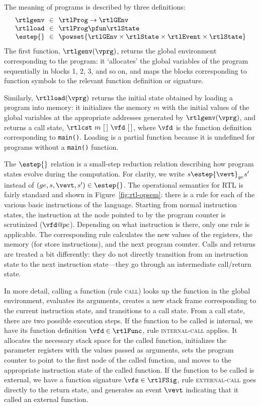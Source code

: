 The meaning of programs is described by three definitions:
\[
\begin{array}{r@{~~}c@{~~}l}
\rtlgenv &\in& \rtlProg \to \rtlGEnv \\
\rtlload &\in& \rtlProg \pfun \rtlState\\
\estep{} &\in& \powset{\rtlGEnv\times\rtlState\times\rtlEvent\times\rtlState}\\
\end{array}
\]
The first function, $\rtlgenv(\vprg)$, returns the global environment corresponding to the program:
it `allocates' the global variables of the program sequentially in blocks 1, 2, 3, and so on, and
maps the blocks corresponding to function symbols to the relevant function definition or signature.

Similarly, $\rtlload(\vprg)$ returns the initial state obtained by loading a program into memory: it
initializes the memory $m$ with the initial values of the global variables at the appropriate
addresses generated by $\rtlgenv(\vprg)$, and returns a call state, $\rtlcst~m~[\,]~\vfd~[\,]$,
where $\vfd$ is the function definition corresponding to \texttt{main()}.  Loading is a partial
function because it is undefined for programs without a \texttt{main()} function.

% 

The $\estep{}$ relation is a small-step reduction relation describing how program states evolve
during the computation.  For clarity, we write $s \estep{\vevt}_{ge} s'$ instead of
$(ge,s,\vevt,s')\in {\estep{}}$.  The operational semantics for RTL is fairly standard and shown in
Figure~\ref{fig:rtl-opsem}: there is a rule for each of the various basic instructions of the
language.  Starting from normal instruction states, the instruction at the node pointed to by the
program counter is scrutinized ($\vfd@pc$).  Depending on what instruction is there, only one rule
is applicable.  The corresponding rule calculates the new values of the registers, the memory (for
store instructions), and the next program counter.  Calls and returns are treated a bit differently:
they do not directly transition from an instruction state to the next instruction state---they go
through an intermediate call/return state.

In more detail, calling a function (rule \textsc{call}) looks up the function in the global
environment, evaluates its arguments, creates a new stack frame corresponding to the current
instruction state, and transitions to a call state.  From a call state, there are two possible
execution steps.  If the function to be called is internal, \ie we have its function definition
$\vfd\in\rtlFunc$, rule \textsc{internal-call} applies.  It allocates the necessary stack space for
the called function, initializes the parameter registers with the values passed as arguments, sets
the program counter to point to the first node of the called function, and moves to the appropriate
instruction state of the called function.  If the function to be called is external, \ie we have a
function signature $\vfs\in\rtlFSig$, rule \textsc{external-call} goes directly to the return state,
and generates an event $\vevt$ indicating that it called an external function.

